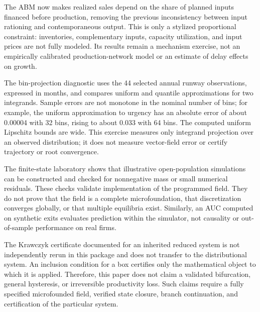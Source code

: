 \documentclass[11pt,a4paper]{article}
\begin{document}
The ABM now makes realized sales depend on the share of planned inputs financed before production, removing the previous inconsistency between input rationing and contemporaneous output. This is only a stylized proportional constraint: inventories, complementary inputs, capacity utilization, and input prices are not fully modeled. Its results remain a mechanism exercise, not an empirically calibrated production-network model or an estimate of delay effects on growth.

The bin-projection diagnostic uses the 44 selected annual runway observations, expressed in months, and compares uniform and quantile approximations for two integrands. Sample errors are not monotone in the nominal number of bins; for example, the uniform approximation to urgency has an absolute error of about 0.00004 with 32 bins, rising to about 0.033 with 64 bins. The computed uniform Lipschitz bounds are wide. This exercise measures only integrand projection over an observed distribution; it does not measure vector-field error or certify trajectory or root convergence.

The finite-state laboratory shows that illustrative open-population simulations can be constructed and checked for nonnegative mass or small numerical residuals. These checks validate implementation of the programmed field. They do not prove that the field is a complete microfoundation, that discretization converges globally, or that multiple equilibria exist. Similarly, an AUC computed on synthetic exits evaluates prediction within the simulator, not causality or out-of-sample performance on real firms.

The Krawczyk certificate documented for an inherited reduced system is not independently rerun in this package and does not transfer to the distributional system. An inclusion condition for a box certifies only the mathematical object to which it is applied. Therefore, this paper does not claim a validated bifurcation, general hysteresis, or irreversible productivity loss. Such claims require a fully specified microfounded field, verified state closure, branch continuation, and certification of the particular system.
\end{document}
